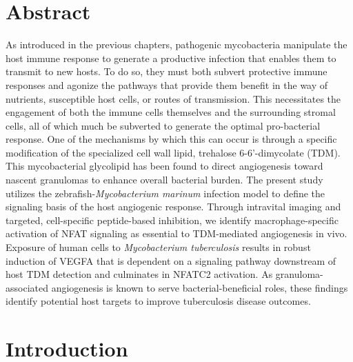 \section{Abstract}

As introduced in the previous chapters, pathogenic mycobacteria manipulate the host immune response to generate a productive infection that enables them to transmit to new hosts. To do so, they must both subvert protective immune responses and agonize the pathways that provide them benefit in the way of nutrients, susceptible host cells, or routes of transmission. This necessitates the engagement of both the immune cells themselves and the surrounding stromal cells, all of which much be subverted to generate the optimal pro-bacterial response. One of the mechanisms by which this can occur is through a specific modification of the specialized cell wall lipid, trehalose 6-6'-dimycolate (TDM). This mycobacterial glycolipid has been found to direct angiogenesis toward nascent granulomas to enhance overall bacterial burden. The present study utilizes the zebrafish-\textit{Mycobacterium marinum} infection model to define the signaling basis of the host angiogenic response. Through intravital imaging and targeted, cell-specific peptide-based inhibition, we identify macrophage-specific activation of NFAT signaling as essential to TDM-mediated angiogenesis in vivo.  Exposure of human cells to \textit{Mycobacterium tuberculosis} results in robust induction of VEGFA that is dependent on a signaling pathway downstream of host TDM detection and culminates in NFATC2 activation. As granuloma-associated angiogenesis is known to serve bacterial-beneficial roles, these findings identify potential host targets to improve tuberculosis disease outcomes.

\section{Introduction}


